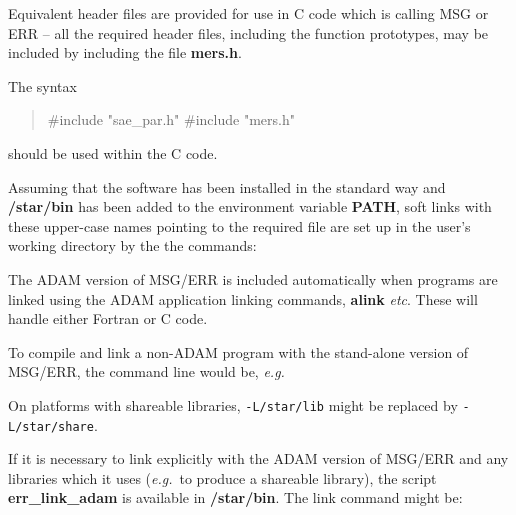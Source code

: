 \documentclass[twoside,11pt]{starlink}
\begin{document}
Equivalent header files are provided for use in C code which is calling MSG
or ERR -- all the required header files, including the function prototypes,
may be included by including the file \textbf{mers.h}.

The syntax
\begin{quote}
\begin{terminalv}
#include "sae_par.h"
#include "mers.h"
\end{terminalv}
\end{quote}
should be used within the C code.

Assuming that the software has been installed in the standard way and
\textbf{/star/bin} has been added to the environment variable
\textbf{PATH}, soft links with these upper-case names pointing to the required
file are set up in the user's working directory by the the commands:
\begin {quote}
\begin{small}
\begin{terminalv}
\end{terminalv}
\end{small}
\end {quote}

The ADAM version of MSG/ERR is included automatically when
programs are linked using the ADAM application linking commands, \textbf{alink}
\textit{etc}. These will handle either Fortran or C code.

To compile and link a non-ADAM program with the stand-alone version of
MSG/ERR, the command line would be, \textit{e.g.}
\begin {quote}
\begin{small}
\begin{terminalv}
\end{terminalv}
\end{small}
\end {quote}

On platforms with shareable libraries, \texttt{-L/star/lib} might be replaced
by \texttt{-L/star/share}.

If it is necessary to link explicitly with the ADAM version of MSG/ERR and any
libraries which it uses (\textit{e.g.}\ to produce a shareable library), the
script \textbf{err\_link\_adam} is available in \textbf{/star/bin}.
The link command might be:
\begin {quote}
\begin {small}
\begin{terminalv}
\end{terminalv}
\end {small}
\end {quote}
\end{document}
